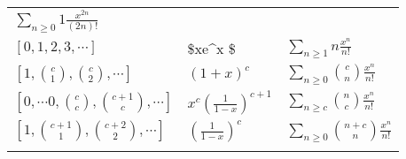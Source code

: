 \begin{longtable}[]{@{}lll@{}}
\begin{minipage}[t]{0.30\columnwidth}
\(\displaystyle\sum_{n \geq 0} 1\frac{x^{2n}}{(2n)!}\)\strut
\end{minipage}\tabularnewline
\begin{minipage}[t]{0.30\columnwidth}\raggedright
\([0, 1, 2, 3, \cdots]\)\strut
\end{minipage} & \begin{minipage}[t]{0.30\columnwidth}\raggedright
\$xe\^{}x \$\strut
\end{minipage} & \begin{minipage}[t]{0.30\columnwidth}\raggedright
\(\displaystyle\sum_{n\geq 1}n \frac {x^n} {n!}\)\strut
\end{minipage}\tabularnewline
\begin{minipage}[t]{0.30\columnwidth}\raggedright
\([1,{c \choose 1}, {c \choose 2}, \cdots]\)\strut
\end{minipage} & \begin{minipage}[t]{0.30\columnwidth}\raggedright
\((1+x)^c\)\strut
\end{minipage} & \begin{minipage}[t]{0.30\columnwidth}\raggedright
\(\displaystyle\sum_{n\geq 0}{c \choose n}\frac {x^n} {n!}\)\strut
\end{minipage}\tabularnewline
\begin{minipage}[t]{0.30\columnwidth}\raggedright
\([0,\cdots 0, {c \choose c}, {c+1 \choose c}, \cdots]\)\strut
\end{minipage} & \begin{minipage}[t]{0.30\columnwidth}\raggedright
\(x^c \left(\frac{1}{1-x}\right)^{c+1}\)\strut
\end{minipage} & \begin{minipage}[t]{0.30\columnwidth}\raggedright
\(\displaystyle\sum_{n\geq c}{n \choose c}\frac {x^n} {n!}\)\strut
\end{minipage}\tabularnewline
\begin{minipage}[t]{0.30\columnwidth}\raggedright
\([1, {c+1 \choose 1}, {c+2 \choose 2}, \cdots]\)\strut
\end{minipage} & \begin{minipage}[t]{0.30\columnwidth}\raggedright
\(\left( \frac 1 {1-x} \right)^c\)\strut
\end{minipage} & \begin{minipage}[t]{0.30\columnwidth}\raggedright
\(\displaystyle\sum_{n \geq 0}{n+c \choose n} \frac {x^n} {n!}\)\strut
\end{minipage}\tabularnewline
\begin{minipage}[t]{0.30\columnwidth}\raggedright

\end{minipage}
\end{longtable}
